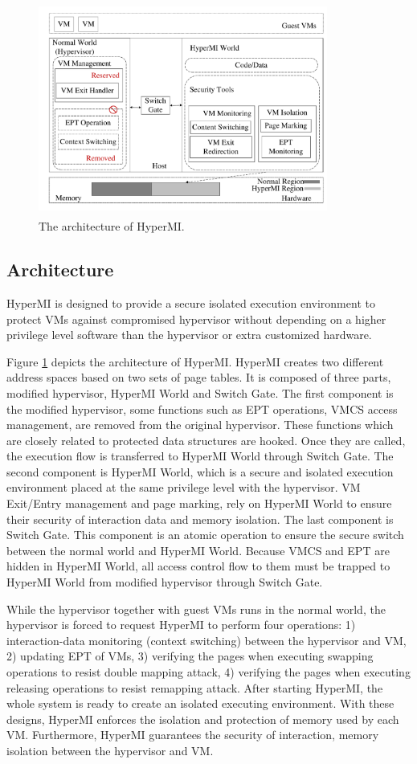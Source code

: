 \documentclass[conference]{IEEEtran}
\begin{document}
\begin{figure}
\centerline{\includegraphics[width=9.5cm, height=7cm]{pdfvmcs1.pdf}}%
\caption{The architecture of HyperMI. } \label{fig1}
\end{figure}

\subsection{Architecture} 
HyperMI is designed to provide a secure isolated execution environment to protect VMs against compromised hypervisor without depending on a higher privilege level software than the hypervisor or extra customized hardware.

Figure \ref{fig1} depicts the architecture of HyperMI. HyperMI creates two different address spaces based on two sets of page tables. It is composed of three parts, modified hypervisor, HyperMI World and Switch Gate. The first component is the modified hypervisor, some functions such as EPT operations, VMCS access management, are removed from the original hypervisor. These functions which are closely related to protected data structures are hooked. Once they are called, the execution flow is transferred to HyperMI World through Switch Gate. The second component is HyperMI World, which is a secure and isolated execution environment placed at the same privilege level with the hypervisor. VM Exit/Entry management and page marking, rely on HyperMI World to ensure their security of interaction data and memory isolation. The last component is Switch Gate. This component is an atomic operation to ensure the secure switch between the normal world and HyperMI World. Because VMCS and EPT are hidden in HyperMI World, all access control flow to them must be trapped to HyperMI World from modified hypervisor through Switch Gate.

While the hypervisor together with guest VMs runs in the normal world, the hypervisor is forced to request HyperMI to perform four operations: 1) interaction-data monitoring (context switching) between the hypervisor and VM, 2) updating EPT of VMs, 3) verifying the pages when executing swapping operations to resist double mapping attack, 4) verifying the pages when executing releasing operations to resist remapping attack. After starting HyperMI, the whole system is ready to create an isolated executing environment. With these designs, HyperMI enforces the isolation and protection of memory used by each VM. Furthermore, HyperMI guarantees the security of interaction, memory isolation between the hypervisor and VM.
\end{document}
